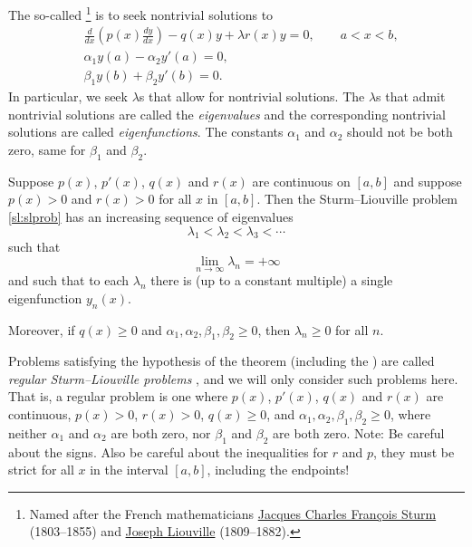 The so-called 
\emph{}%
\footnote{Named after the French mathematicians
\href{https://en.wikipedia.org/wiki/Jacques_Charles_Fran\%C3\%A7ois_Sturm}{Jacques Charles Fran\c{c}ois Sturm}
(1803--1855) and
\href{https://en.wikipedia.org/wiki/Liouville}{Joseph Liouville}
(1809--1882).} is to seek
nontrivial solutions to
\begin{equation} \label{sl:slprob}
\boxed{~~
\begin{aligned}
&\frac{d}{dx} \left( p(x) \frac{dy}{dx} \right)
- q(x) y + \lambda r(x) y = 0, \qquad a < x < b, \\
&\alpha_1 y(a) - \alpha_2 y'(a) = 0, \\
&\beta_1 y(b) + \beta_2 y'(b) = 0.
\end{aligned}
~~}
\end{equation}
In particular, we seek $\lambda$s that allow for nontrivial solutions.
The $\lambda$s that admit nontrivial solutions
are called the \emph{eigenvalues}
and the corresponding
nontrivial solutions are called
\emph{eigenfunctions}.
The constants $\alpha_1$ and $\alpha_2$ should not be both zero, same for
$\beta_1$ and $\beta_2$.

\begin{theorem} \label{sl:slregthm}
Suppose $p(x)$, $p'(x)$, $q(x)$ and $r(x)$ are continuous on $[a,b]$
and suppose $p(x) > 0$ and $r(x) > 0$ for all $x$ in $[a,b]$.
Then the Sturm--Liouville problem \eqref{sl:slprob}
has an increasing sequence of eigenvalues
\begin{equation*}
\lambda_1 < \lambda_2 < \lambda_3 < \cdots 
\end{equation*}
such that
\begin{equation*}
\lim_{n \to \infty} \lambda_n = +\infty
\end{equation*}
and such that to each $\lambda_n$ there is (up to a constant multiple)
a single eigenfunction $y_n(x)$. 

Moreover, if $q(x) \geq 0$ and $\alpha_1, \alpha_2, \beta_1, \beta_2 \geq 0$,
then $\lambda_n \geq 0$ for all $n$.
\end{theorem}

Problems satisfying the hypothesis of the theorem
(including the )
are called
\emph{regular Sturm--Liouville problems}%
,
and we will only consider such problems here.
That is, a regular problem is one where
$p(x)$, $p'(x)$, $q(x)$ and $r(x)$ are continuous, $p(x) > 0$, $r(x) > 0$,
$q(x) \geq 0$, and $\alpha_1, \alpha_2, \beta_1, \beta_2 \geq 0$,
where neither $\alpha_1$ and $\alpha_2$ are both zero,
nor
$\beta_1$ and $\beta_2$ are both zero.
Note: Be careful about the signs.  Also be careful about the inequalities
for $r$ and $p$, they
must be strict for all $x$ in the interval $[a,b]$, including the endpoints!

